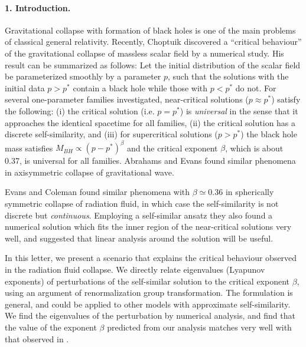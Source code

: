 \narrowtext



\paragraph*{1. Introduction. }
Gravitational collapse with formation of black holes is one of the
main problems of classical general relativity.
Recently,  Choptuik \cite{Cho93} discovered
a ``critical behaviour'' of the gravitational collapse of massless scalar
field by a numerical study. His result can be summarized as follows:
Let the initial distribution of the scalar field be parameterized
smoothly by a parameter $p$,
such that the solutions with the initial data
$p>p^*$ contain a black hole
while those with $p<p^*$ do not.
For several  one-parameter families investigated,
near-critical solutions ($p \approx p^*$) satisfy the following:
(i) the critical solution (i.e. $p = p^*$) is {\em universal}
in the sense that it
approaches the identical spacetime for all families,
(ii) the critical solution  has a discrete self-similarity, and
(iii) for supercritical solutions ($p > p^*$) the black hole mass satisfies
$M_{BH}\propto (p-p^*)^\beta$
and the critical exponent $\beta$, which is about 0.37, is universal for
all families. Abrahams and Evans \cite{AbEv93} found similar
phenomena in axisymmetric collapse of gravitational wave.

Evans and Coleman
\cite{EvCo94}  found similar phenomena with $\beta\simeq0.36$
in spherically symmetric collapse of radiation fluid,
in which case the self-similarity is not discrete but {\em
continuous}.
Employing a self-similar ansatz they also found a numerical solution
which fits the inner region of the near-critical solutions very well,
and suggested that linear analysis around the solution will be useful.



In this letter,
we present a scenario that explains the
critical behaviour observed in the
radiation fluid collapse. We directly
relate eigenvalues (Lyapunov exponents) of perturbations
of the self-similar solution to the critical exponent $\beta$,
using an argument of renormalization group transformation. The formulation
is general, and could be applied to other models with approximate
self-similarity.  We find the
eigenvalues of the perturbation by numerical analysis,
and find that the value of the exponent
$\beta$ predicted from our analysis matches very well with that observed
in \cite{EvCo94}.

